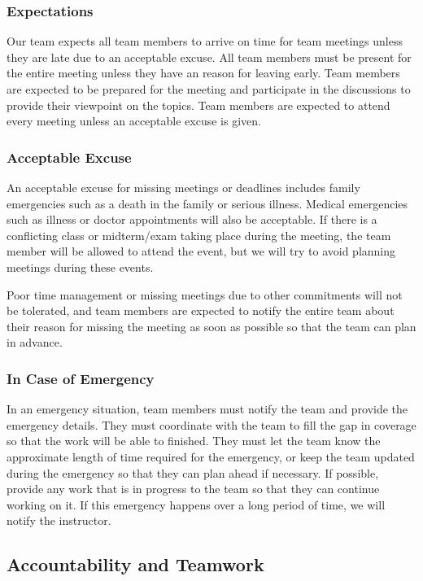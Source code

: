 \documentclass{article}
\begin{document}
\subsubsection*{Expectations}

Our team expects all team members to arrive on time for team meetings unless they are late due to an acceptable excuse. All team members must be present for the entire meeting unless they have an reason for leaving early. 
Team members are expected to be prepared for the meeting and participate in the discussions to provide their viewpoint on the topics. Team members are expected to attend every meeting unless an acceptable excuse is given.

\subsubsection*{Acceptable Excuse}

An acceptable excuse for missing meetings or deadlines includes family emergencies such as a death in the family or serious illness. Medical emergencies such as illness or doctor appointments will also be acceptable. 
If there is a conflicting class or midterm/exam taking place during the meeting, the team member will be allowed to attend the event, but we will try to avoid planning meetings during these events. 

Poor time management or missing meetings due to other commitments will not be tolerated, and team members are expected to notify the entire team about their reason for missing the meeting as soon as possible so that the team can plan in advance.

\subsubsection*{In Case of Emergency}

In an emergency situation, team members must notify the team and provide the emergency details. They must coordinate with the team to fill the gap in coverage so that the work will be able to finished.
They must let the team know the approximate length of time required for the emergency, or keep the team updated during the emergency so that they can plan ahead if necessary. If possible, provide any work 
that is in progress to the team so that they can continue working on it. If this emergency happens over a long period of time, we will notify the instructor.

\subsection*{Accountability and Teamwork}
\end{document}
